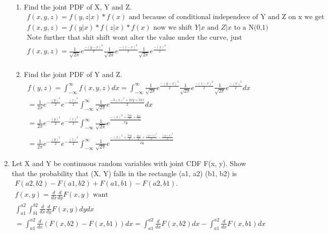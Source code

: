 \documentclass[11pt]{article}
\begin{document}
\begin{enumerate}
\begin{enumerate}
	\item Find the joint PDF of X, Y and Z.
	\begin{gather}
		f(x,y,z) = f(y,z|x)*f(x) \text{ and because of conditional independece of Y and Z on x we get} \\
		f(x,y,z) = f(y|x)*f(z|x)*f(x) \text{ now we shift $Y|x$ and $Z|x$ to a N(0,1)}\\
		\text{Note further that shit shift wont alter the value under the curve, just where the density takes place}\\
			f(x,y,z) = \frac{1}{\sqrt{2\pi}} e ^ {\frac{-(y-x)^2}{2}} \frac{1}{\sqrt{2\pi}} e ^ {\frac{-(z-x)^2}{2}} \frac{1}{\sqrt{2\pi}} e ^ {\frac{-(x)^2}{2}} \\
	\end{gather}
	\item Find the joint PDF of Y and Z.
	\begin{gather}
		f(y,z) = \int_{-\infty}^{\infty} f(x,y,z) dx =  \int_{-\infty}^{\infty} \frac{1}{\sqrt{2\pi}} e ^ {\frac{-(y-x)^2}{2}} \frac{1}{\sqrt{2\pi}} e ^ {\frac{-(z-x)^2}{2}} \frac{1}{\sqrt{2\pi}} e ^ {\frac{-(x)^2}{2}} dx\\
		=\frac{1}{2\pi} e ^ {-\frac{(y)^2}{2}} e ^ {-\frac{(z)^2}{2}}   \int_{-\infty}^{\infty} \frac{1}{\sqrt{2\pi}} e ^ {\frac{-3(x)^2 +2xy+2xz}{2}} dx \\
		= \frac{1}{2\pi} e ^ {-\frac{(y)^2}{2}} e ^ {-\frac{(z)^2}{2}}   \int_{-\infty}^{\infty} \frac{1}{\sqrt{2\pi}} e ^ {\frac{-(x)^2 +\frac{2xy}{3}+\frac{2xz}{3}}{2\frac{1}{3}}}\\
		=\frac{1}{2\pi} e ^ {-\frac{(y)^2}{2}} e ^ {-\frac{(z)^2}{2}}   \int_{-\infty}^{\infty} \frac{1}{\sqrt{2\pi}} e ^ {\frac{-(x)^2 +\frac{2xy}{3}+\frac{2xz}{3} + \frac{(y+z)^2}{3} - \frac{(y+z)^2}{3}} {2\frac{1}{3}}}
	\end{gather}
\end{enumerate}
\item Let X and Y be continuous random variables with joint CDF F(x, y). Show that the probability that (X, Y) falls in the rectangle (a1, a2) (b1, b2) is
\begin{gather}
	F(a2, b2) - F(a1, b2) + F(a1, b1) - F(a2, b1).\\
	f(x,y) = \frac{d}{dx}\frac{d}{dy}F(x,y) \text{ want} \\
	\int_{a1}^{a2}\int_{b1}^{b2}\frac{d}{dx}\frac{d}{dy}F(x,y)dydx\\
	=\int_{a1}^{a2}\frac{d}{dx}(F(x,b2)-F(x,b1)) dx = \int_{a1}^{a2}\frac{d}{dx}F(x,b2) dx - \int_{a1}^{a2}\frac{d}{dx}F(x,b1) dx\\

\end{gather}
\end{enumerate}
\end{document}
